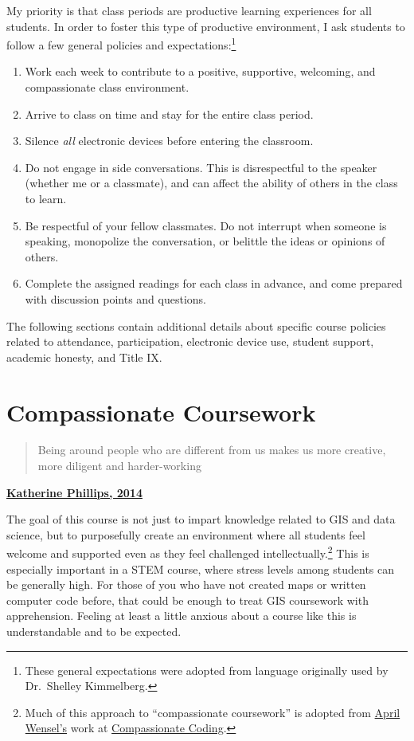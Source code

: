 \documentclass[
]{book}
\providecommand{\tightlist}{%
  \setlength{\itemsep}{0pt}\setlength{\parskip}{0pt}}
\begin{document}
My priority is that class periods are productive learning experiences for all students. In order to foster this type of productive environment, I ask students to follow a few general policies and expectations:\footnote{These general expectations were adopted from language originally used by Dr.~Shelley Kimmelberg.}

\begin{enumerate}
\def\labelenumi{\arabic{enumi}.}
\tightlist
\item
  Work each week to contribute to a positive, supportive, welcoming, and compassionate class environment.
\item
  Arrive to class on time and stay for the entire class period.
\item
  Silence \emph{all} electronic devices before entering the classroom.
\item
  Do not engage in side conversations. This is disrespectful to the speaker (whether me or a classmate), and can affect the ability of others in the class to learn.
\item
  Be respectful of your fellow classmates. Do not interrupt when someone is speaking, monopolize the conversation, or belittle the ideas or opinions of others.
\item
  Complete the assigned readings for each class in advance, and come prepared with discussion points and questions.
\end{enumerate}

The following sections contain additional details about specific course policies related to attendance, participation, electronic device use, student support, academic honesty, and Title IX.

\hypertarget{compassionate-coursework}{%
\section{Compassionate Coursework}\label{compassionate-coursework}}

\begin{quote}
Being around people who are different from us makes us more creative, more diligent and harder-working
\end{quote}

\textbf{\href{https://www.scientificamerican.com/article/how-diversity-makes-us-smarter/}{Katherine Phillips, 2014}}

The goal of this course is not just to impart knowledge related to GIS and data science, but to purposefully create an environment where all students feel welcome and supported even as they feel challenged intellectually.\footnote{Much of this approach to ``compassionate coursework'' is adopted from \href{https://twitter.com/aprilwensel}{April Wensel's} work at \href{https://compassionatecoding.com}{Compassionate Coding}.} This is especially important in a STEM course, where stress levels among students can be generally high. For those of you who have not created maps or written computer code before, that could be enough to treat GIS coursework with apprehension. Feeling at least a little anxious about a course like this is understandable and to be expected.
\end{document}
